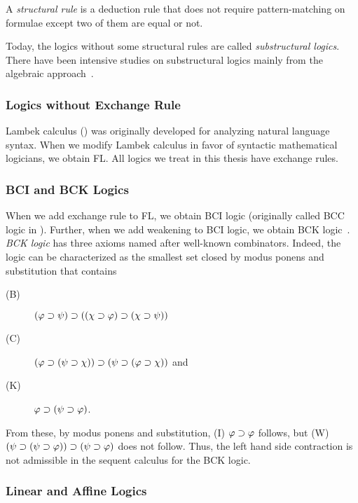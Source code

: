 A \textit{structural rule}
is a deduction rule that does not require
pattern-matching on formulae except two of them are equal or not.

Today, the logics without some structural rules are called \textit{substructural
logics}.  There have been intensive studies on
substructural logics mainly from the algebraic
approach~\cite{residuated}.

\subsubsection{Logics without Exchange Rule}

Lambek calculus () was originally developed for
analyzing natural language syntax.  When we modify Lambek calculus in
favor of syntactic mathematical logicians, we obtain FL.
All logics we treat in this thesis have exchange rules.

\subsubsection{BCI and BCK Logics}

When we add exchange rule to FL, we obtain BCI logic (originally called
BCC logic in \citep{ono-komori-1985}).
Further, when we add weakening to BCI logic, we obtain BCK
logic~\citep{ono-komori-1985}.
\textit{BCK logic} has three axioms named after well-known
combinators.  Indeed, the logic can be characterized as the smallest set
closed by modus ponens and substitution that contains
\begin{description}
 \item[(B)] $(\varphi\supset\psi)\supset((\chi\supset\varphi)\supset(\chi\supset\psi))$
 \item[(C)] $(\varphi\supset(\psi\supset\chi))\supset(\psi\supset(\varphi\supset\chi))$ and
 \item[(K)] $\varphi\supset(\psi\supset\varphi)$\enspace.
\end{description}
From these, by modus ponens and substitution, (I) $\varphi\supset\varphi$
follows, but
(W) $(\psi\supset(\psi\supset\varphi))\supset(\psi\supset\varphi)$ does not follow.
Thus, the left hand side contraction is not admissible in the sequent
calculus for the BCK logic.

\subsubsection{Linear and Affine Logics}


